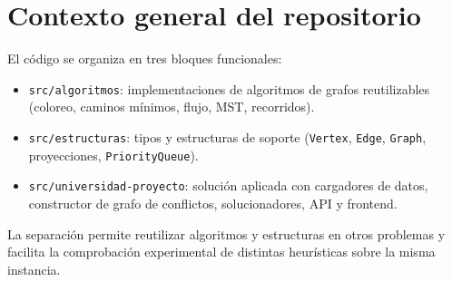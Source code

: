 \chapter{Contexto general del repositorio}

El código se organiza en tres bloques funcionales:

\begin{itemize}[leftmargin=1.5cm]
  \item \texttt{src/algoritmos}: implementaciones de algoritmos de grafos reutilizables (coloreo, caminos mínimos, flujo, MST, recorridos).
  \item \texttt{src/estructuras}: tipos y estructuras de soporte (\texttt{Vertex}, \texttt{Edge}, \texttt{Graph}, proyecciones, \texttt{PriorityQueue}).
  \item \texttt{src/universidad-proyecto}: solución aplicada con cargadores de datos, constructor de grafo de conflictos, solucionadores, API y frontend.
\end{itemize}

La separación permite reutilizar algoritmos y estructuras en otros problemas y facilita la comprobación experimental de distintas heurísticas sobre la misma instancia.

